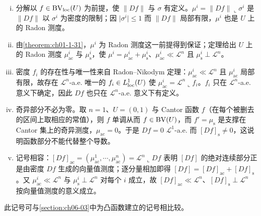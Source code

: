 \documentclass[../../main.tex]{subfiles}%
\begin{document}
\begin{remark}\label{remark:ch05-def-5-1-测度分解-条件}
\begin{enumerate}[(i)]
\item 分解以 $f\in\mathrm{BV}_{\mathrm{loc}}(U)$ 为前提，使 $\lVert Df\rVert$ 与 $\sigma$ 有定义。$\mu^i=\lVert Df\rVert\llcorner\sigma^i$ 是 $\lVert Df\rVert$ 以 $\sigma^i$ 为密度的限制；因 $\lvert\sigma^i\rvert\leqslant1$ 而 $\lVert Df\rVert$ 局部有限，$\mu^i$ 也是 $U$ 上的 Radon 测度。
\item 由\cref{theorem:ch01-1-31}，$\mu^i$ 为 Radon 测度这一前提得到保证；定理给出 $U$ 上的 Radon 测度 $\mu^i_{\mathrm{ac}}$ 与 $\mu^i_{\mathrm{s}}$，使 $\mu^i=\mu^i_{\mathrm{ac}}+\mu^i_{\mathrm{s}}$、$\mu^i_{\mathrm{ac}}\ll\mathcal{L}^n$ 且 $\mu^i_{\mathrm{s}}\perp\mathcal{L}^n$。%
\item 密度 $f_i$ 的存在性与唯一性来自 Radon--Nikodym 定理：$\mu^i_{\mathrm{ac}}\ll\mathcal{L}^n$ 且 $\mu^i_{\mathrm{ac}}$ 局部有限，故存在 $\mathcal{L}^n$-a.e. 唯一的 $f_i\in L^1_{\mathrm{loc}}(U)$ 使 $\mu^i_{\mathrm{ac}}=\mathcal{L}^n\llcorner f_i$。$f_i$ 只在 $\mathcal{L}^n$-a.e. 意义下确定，因此 $Df$ 也只在 $\mathcal{L}^n$-a.e. 意义下有定义。
\item 奇异部分不必为零。取 $n=1$、$U=(0,1)$ 与 Cantor 函数 $f$（在每个被删去的区间上取相应的常值），则 $f$ 单调从而 $f\in\mathrm{BV}(U)$，而 $f'=\mu_{\mathrm{s}}$ 是支撑在 Cantor 集上的奇异测度，$\mu_{\mathrm{ac}}=0$。于是 $Df=0$ $\mathcal{L}^1$-a.e. 而 $[Df]_{\mathrm{s}}\neq0$，这说明函数部分不能代替整个导数。
\item 记号相容：$[Df]_{\mathrm{ac}}=(\mu^1_{\mathrm{ac}},\cdots,\mu^n_{\mathrm{ac}})=\mathcal{L}^n\llcorner Df$ 表明 $[Df]$ 的绝对连续部分正是由密度 $Df$ 生成的向量值测度；逐分量相加即得 $[Df]=[Df]_{\mathrm{ac}}+[Df]_{\mathrm{s}}$。又 $\mu^i_{\mathrm{ac}}\ll\mathcal{L}^n$ 与 $\mu^i_{\mathrm{s}}\perp\mathcal{L}^n$ 对每个 $i$ 成立，故 $[Df]_{\mathrm{ac}}\ll\mathcal{L}^n$、$[Df]_{\mathrm{s}}\perp\mathcal{L}^n$ 按向量值测度的意义成立。
\end{enumerate}
\end{remark}

\begin{remark}\label{remark:ch05-def-5-1-凸函数}
此记号可与\cref{section:ch06-03}中为凸函数建立的记号相比较。%
\end{remark}
\end{document}
